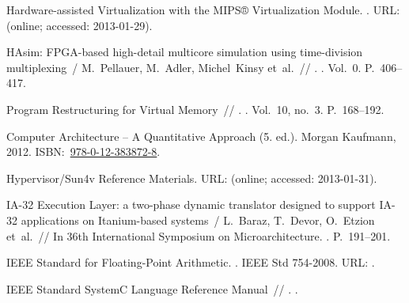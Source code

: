 \begin{thebibliography}{10}
Hardware-assisted Virtualization with the {MIPS}® Virtualization Module.
  \BibDash
{}. \BibDash
\newblock URL:
  (online; accessed: 2013-01-29).

{HAsim: FPGA-based high-detail multicore simulation using time-division
  multiplexing}~/ M.~Pellauer, M.~Adler, Michel~Kinsy et~al.~//
  \href{http://dx.doi.org/10.1109/HPCA.2011.5749747}{}. \BibDash
{}. \BibDash
\newblock Vol.~0. \BibDash
\newblock P.~406–417.

 {Program Restructuring for Virtual
  Memory}~// . \BibDash
{}. \BibDash
\newblock Vol.~10, no.~3. \BibDash
\newblock P.~168–192.

 {Computer Architecture -- A
  Quantitative Approach (5. ed.)}. \BibDash
\newblock Morgan Kaufmann, 2012. \BibDash
\newblock
  ISBN:~\href{http://isbndb.com/search-all.html?kw=978-0-12-383872-8}{978-0-12-383872-8}.

{Hypervisor/Sun4v Reference Materials}. \BibDash
\newblock URL:
  (online; accessed: 2013-01-31).

{{IA-32} {Execution Layer}: a two-phase dynamic translator designed to support
  {IA}-32 applications on {Itanium}-based systems}~/ L.~Baraz, T.~Devor,
  O.~Etzion et~al.~// {In 36th International Symposium on Microarchitecture}.
  \BibDash
{}. \BibDash
\newblock P.~191–201.

{IEEE} Standard for Floating-Point Arithmetic. \BibDash
{}. \BibDash
\newblock IEEE Std 754-2008. URL:
  .

{{IEEE} Standard {SystemC} Language Reference Manual}~// . \BibDash
{}.


\end{thebibliography}
